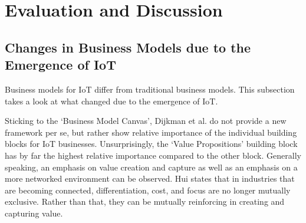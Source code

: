 \section{Evaluation and Discussion}
\label{sec:eval}

	\subsection{Changes in Business Models due to the Emergence of IoT}
		Business models for IoT differ from traditional business models. This subsection takes a look at what changed due to the emergence of IoT.

		Sticking to the `Business Model Canvas', Dijkman et al. \cite{dijkman} do not provide a new framework per se, but rather show relative importance of the individual building blocks for IoT businesses. Unsurprisingly, the `Value Propositions' building block has by far the highest relative importance compared to the other block. Generally speaking, an emphasis on value creation and capture as well as an emphasis on a more networked environment can be observed. Hui \cite{hui} states that in industries that are becoming connected, differentiation, cost, and focus are no longer mutually exclusive. Rather than that, they can be mutually reinforcing in creating and capturing value.

